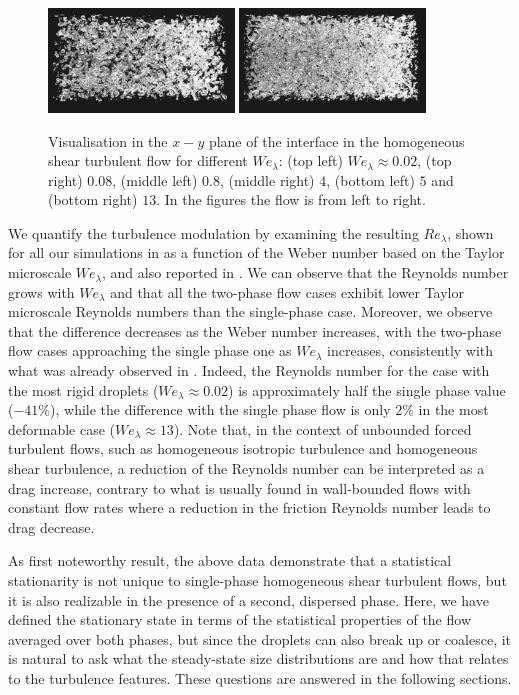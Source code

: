 \begin{figure}
	\includegraphics[width=0.44\textwidth]{view5}
	\includegraphics[width=0.44\textwidth]{view6}
	\caption{Visualisation in the $x-y$ plane of the interface in the homogeneous shear turbulent flow for different $We_\lambda$: (top left) $We_\lambda \approx 0.02$, (top right) $0.08$, (middle left) $0.8$, (middle right) $4$, (bottom left) $5$ and (bottom right) $13$. In the figures the flow is from left to right.}
	\label{fig:3dview}
\end{figure}

We quantify the turbulence modulation by examining the resulting $Re_\lambda$, shown for all our simulations in  as a function of the Weber number based on the Taylor microscale $We_\lambda$, and also reported in . We can observe that the Reynolds number grows with $We_\lambda$ and that all the two-phase flow cases exhibit lower Taylor microscale Reynolds numbers than the single-phase case. Moreover, we observe that the difference decreases as the Weber number increases, with the two-phase flow cases approaching the single phase one as $We_\lambda$ increases, consistently with what was already observed in . Indeed, the Reynolds number for the case with the most rigid droplets ($We_\lambda \approx 0.02$) is approximately half the single phase value ($-41\%$), while the difference with the single phase flow is only $2\%$ in the most deformable case ($We_\lambda \approx 13$). Note that, in the context of unbounded forced turbulent flows, such as homogeneous isotropic turbulence and homogeneous shear turbulence, a reduction of the Reynolds number can be interpreted as a drag increase, contrary to what is usually found in wall-bounded flows with constant flow rates where a reduction in the friction Reynolds number leads to drag decrease.

As first noteworthy result, the above data demonstrate that a statistical stationarity is not unique to single-phase homogeneous shear turbulent flows, but it is also realizable in the presence of a second, dispersed phase. Here, we have defined the stationary state in terms of the statistical properties of the flow averaged over both phases, but since the droplets can also break up or coalesce, it is natural to ask what the steady-state size distributions are and how that relates to the turbulence features. These questions are answered in the following sections.

